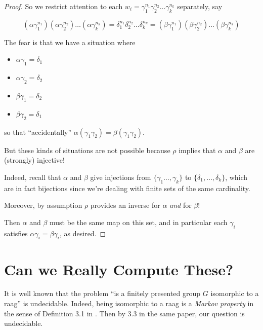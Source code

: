\documentclass[12pt]{article}
\theoremstyle{definition}
\theoremstyle{theorem}
\begin{document}
\begin{proof}
    So we restrict attention to each 
    $w_i = \gamma_1^{n_1} \gamma_2^{n_2} \ldots \gamma_k^{n_k}$ separately, say

    \[ 
    (\alpha \gamma_1^{n_1}) (\alpha \gamma_2^{n_2}) \ldots (\alpha \gamma_k^{n_k}) = 
    \delta_1^{n_1} \delta_2^{n_2} \ldots \delta_k^{n_k} =
    (\beta \gamma_1^{n_1}) (\beta \gamma_2^{n_2}) \ldots (\beta \gamma_k^{n_k})
    \]

    The fear is that we have a situation where 

    \begin{itemize}
        \item $\alpha \gamma_1 = \delta_1$
        \item $\alpha \gamma_2 = \delta_2$
        \item $\beta \gamma_1 = \delta_2$
        \item $\beta \gamma_2 = \delta_1$
    \end{itemize}

    so that ``accidentally'' $\alpha(\gamma_1 \gamma_2) = \beta(\gamma_1 \gamma_2)$.

    But these kinds of situations are not possible because $\rho$ implies that
    $\alpha$ and $\beta$ are (strongly) injective!

    Indeed, recall that $\alpha$ and $\beta$ give injections from $\{ \gamma_1 \ldots, \gamma_k \}$
    to $\{ \delta_1, \ldots, \delta_k \}$, which are in fact bijections since we're
    dealing with finite sets of the same cardinality. 

    Moreover, by assumption $\rho$ provides an inverse for $\alpha$ \emph{and} 
    for $\beta$!

    Then $\alpha$ and $\beta$ must be the same map on this set, and in particular
    each $\gamma_i$ satisfies $\alpha \gamma_i = \beta \gamma_i$, as desired.
\end{proof}

\section{Can we Really Compute These?}
\label{computing}

It is well known that the problem 
``is a finitely presented group $G$ isomorphic to a raag'' 
is undecidable. Indeed, being isomorphic to a raag is a 
\emph{Markov property} in the sense of Definition 3.1 in 
. Then by 3.3 in
the same paper, our question is undecidable.
\end{document}
